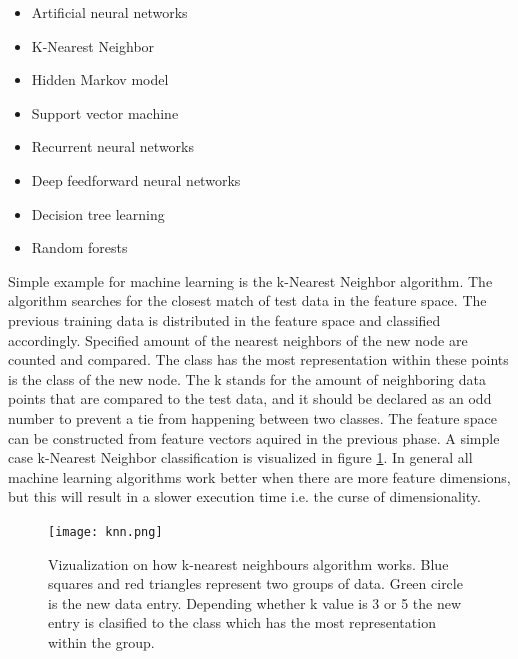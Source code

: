 \documentclass{article}
\begin{document}
        \begin{itemize}
          \item Artificial neural networks
          \item K-Nearest Neighbor
          \item Hidden Markov model
          \item Support vector machine
          \item Recurrent neural networks
          \item Deep feedforward neural networks
          \item Decision tree learning
          \item Random forests  \cite{SAS}
        \end{itemize}

          Simple example for machine learning is the k-Nearest Neighbor algorithm. The algorithm searches for the closest match of test data in the feature space. The previous training data is distributed in the feature space and classified accordingly. Specified amount of the nearest neighbors of the new node are counted and compared. The class has the most representation within these points is the class of the new node. The k stands for the amount of neighboring data points that are compared to the test data, and it should be declared as an odd number to prevent a tie from happening between two classes. The feature space can be constructed from feature vectors aquired in the previous phase. A simple case k-Nearest Neighbor classification is visualized in figure \ref{fig:knn}. In general all machine learning algorithms work better when there are more feature dimensions, but this will result in a slower execution time i.e. the curse of dimensionality.\cite{Beyer}

          \begin{figure}
            \centering
            \texttt{[image: knn.png]}
            \caption{Vizualization on how k-nearest neighbours algorithm works. Blue squares
                      and red triangles represent two groups of data. Green circle is the new
                      data entry. Depending whether k value is 3 or 5 the new entry is clasified
                      to the class which has the most representation within the group.\label{fig:knn} }
          \end{figure}
\end{document}
